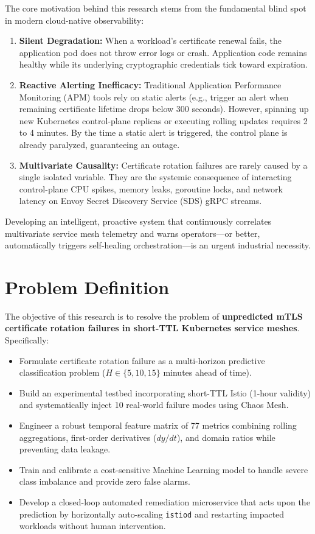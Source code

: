 \documentclass[12pt,a4paper]{report}
\begin{document}
The core motivation behind this research stems from the fundamental blind spot in modern cloud-native observability:
\begin{enumerate}
    \item \textbf{Silent Degradation:} When a workload's certificate renewal fails, the application pod does not throw error logs or crash. Application code remains healthy while its underlying cryptographic credentials tick toward expiration.
    \item \textbf{Reactive Alerting Inefficacy:} Traditional Application Performance Monitoring (APM) tools rely on static alerts (e.g., trigger an alert when remaining certificate lifetime drops below 300 seconds). However, spinning up new Kubernetes control-plane replicas or executing rolling updates requires 2 to 4 minutes. By the time a static alert is triggered, the control plane is already paralyzed, guaranteeing an outage.
    \item \textbf{Multivariate Causality:} Certificate rotation failures are rarely caused by a single isolated variable. They are the systemic consequence of interacting control-plane CPU spikes, memory leaks, goroutine locks, and network latency on Envoy Secret Discovery Service (SDS) gRPC streams.
\end{enumerate}

Developing an intelligent, proactive system that continuously correlates multivariate service mesh telemetry and warns operators—or better, automatically triggers self-healing orchestration—is an urgent industrial necessity.

\section{Problem Definition}
The objective of this research is to resolve the problem of \textbf{unpredicted mTLS certificate rotation failures in short-TTL Kubernetes service meshes}. Specifically:
\begin{itemize}
    \item Formulate certificate rotation failure as a multi-horizon predictive classification problem ($H \in \{5, 10, 15\}$ minutes ahead of time).
    \item Build an experimental testbed incorporating short-TTL Istio (1-hour validity) and systematically inject 10 real-world failure modes using Chaos Mesh.
    \item Engineer a robust temporal feature matrix of 77 metrics combining rolling aggregations, first-order derivatives ($dy/dt$), and domain ratios while preventing data leakage.
    \item Train and calibrate a cost-sensitive Machine Learning model to handle severe class imbalance and provide zero false alarms.
    \item Develop a closed-loop automated remediation microservice that acts upon the prediction by horizontally auto-scaling \texttt{istiod} and restarting impacted workloads without human intervention.
\end{itemize}
\end{document}
